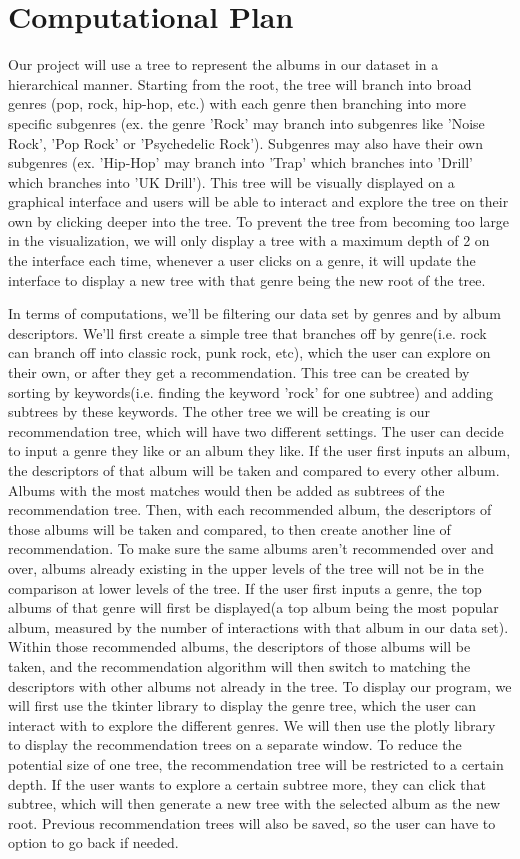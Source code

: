 \documentclass[fontsize=11pt]{article}
\begin{document}
\section*{Computational Plan}
Our project will use a tree to represent the albums in our dataset in a hierarchical manner. Starting from the root, the tree will branch into broad genres (pop, rock, hip-hop, etc.) with each genre then branching into more specific subgenres (ex. the genre 'Rock' may branch into subgenres like 'Noise Rock', 'Pop Rock' or 'Psychedelic Rock'). Subgenres may also have their own subgenres (ex. 'Hip-Hop' may branch into 'Trap' which branches into 'Drill' which branches into 'UK Drill'). This tree will be visually displayed on a graphical interface and users will be able to interact and explore the tree on their own by clicking deeper into the tree. To prevent the tree from becoming too large in the visualization, we will only display a tree with a maximum depth of 2 on the interface each time, whenever a user clicks on a genre, it will update the interface to display a new tree with that genre being the new root of the tree. 

In terms of computations, we'll be filtering our data set by genres and by album descriptors. We'll first create a simple tree that branches off by genre(i.e. rock can branch off into classic rock, punk rock, etc), which the user can explore on their own, or after they get a recommendation. This tree can be created by sorting by keywords(i.e. finding the keyword 'rock' for one subtree) and adding subtrees by these keywords. The other tree we will be creating is our recommendation tree, which will have two different settings. The user can decide to input a genre they like or an album they like. If the user first inputs an album, the descriptors of that album will be taken and compared to every other album. Albums with the most matches would then be added as subtrees of the recommendation tree. Then, with each recommended album, the descriptors of those albums will be taken and compared, to then create another line of recommendation. To make sure the same albums aren't recommended over and over, albums already existing in the upper levels of the tree will not be in the comparison at lower levels of the tree. If the user first inputs a genre, the top albums of that genre will first be displayed(a top album being the most popular album, measured by the number of interactions with that album in our data set). Within those recommended albums, the descriptors of those albums will be taken, and the recommendation algorithm will then switch to matching the descriptors with other albums not already in the tree.
    To display our program, we will first use the tkinter library to display the genre tree, which the user can interact with to explore the different genres. We will then use the plotly library to display the recommendation trees on a separate window. To reduce the potential size of one tree, the recommendation tree will be restricted to a certain depth. If the user wants to explore a certain subtree more, they can click that subtree, which will then generate a new tree with the selected album as the new root. Previous recommendation trees will also be saved, so the user can have to option to go back if needed.
\end{document}
